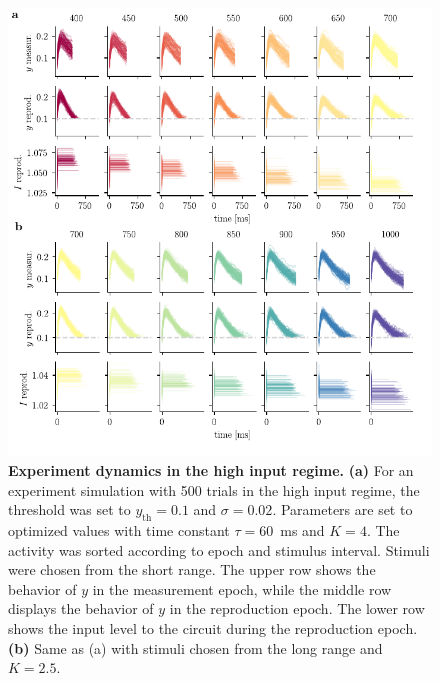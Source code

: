 \documentclass[10pt, a4paper]{article}
\begin{document}
\begin{figure}[!htb]
	\centering
	\includegraphics{figures/supp_experiment_high.pdf}
	\caption{\textbf{Experiment dynamics in the high input regime.} 
	\textbf{(a)} For an experiment simulation with 500 trials in the high input regime, the threshold was set to $y_{\text{th}}=0.1$ and $\sigma=0.02$. Parameters are set to optimized values with time constant $\tau = 60$~ms and $K = 4$. The activity was sorted according to epoch and stimulus interval. Stimuli were chosen from the short range. The upper row shows the behavior of $y$ in the measurement epoch, while the middle row displays the behavior of $y$ in the reproduction epoch. The lower row shows the input level to the circuit during the reproduction epoch. 
	\textbf{(b)} Same as (a) with stimuli chosen from the long range and $K = 2.5$.
	}
\label{sup:experiment_high}
\end{figure}
\end{document}
